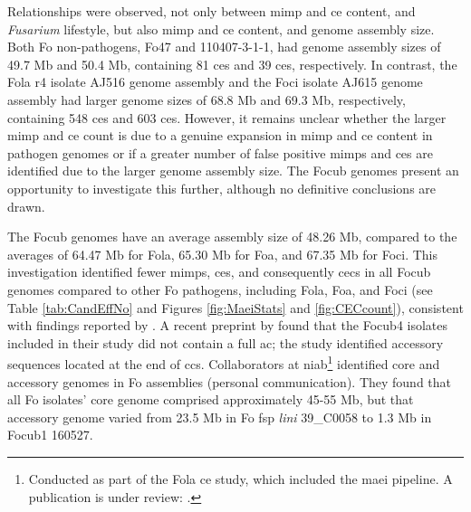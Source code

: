 Relationships were observed, not only between \ac{mimp} and \ac{ce} content, and \textit{Fusarium} lifestyle,  but also \ac{mimp} and \ac{ce} content, and genome assembly size. Both \ac{Fo} non-pathogens, Fo47 and 110407-3-1-1, had genome assembly sizes of 49.7 Mb and 50.4 Mb, containing 81 \acp{ce} and 39 \acp{ce}, respectively. In contrast, the \ac{Fola} \ac{r4} isolate AJ516 genome assembly and the \ac{Foci} isolate AJ615 genome assembly had larger genome sizes of 68.8 Mb and 69.3 Mb, respectively, containing 548 \acp{ce} and 603 \acp{ce}. However, it remains unclear whether the larger \ac{mimp} and \ac{ce} count is due to a genuine expansion in \ac{mimp} and \ac{ce} content in pathogen genomes or if a greater number of false positive \acp{mimp} and \acp{ce} are identified due to the larger genome assembly size. The \ac{Focub} genomes present an opportunity to investigate this further, although no definitive conclusions are drawn.

The \ac{Focub} genomes have an average assembly size of 48.26 Mb, compared to the averages of 64.47 Mb for \ac{Fola}, 65.30 Mb for \ac{Foa}, and 67.35 Mb for \ac{Foci}. This investigation identified fewer \acp{mimp}, \acp{ce}, and consequently \acp{cec} in all \ac{Focub} genomes compared to other \ac{Fo} pathogens, including \ac{Fola}, \ac{Foa}, and \ac{Foci} (see Table \ref{tab:CandEffNo} and Figures \ref{fig:MaeiStats} and \ref{fig:CECcount}), consistent with findings reported by \textcite{Dam2016, FoEC2}. A recent preprint by \textcite{Ma2023} found that the \ac{Focub4} isolates included in their study did not contain a full \acf{ac}; the study identified accessory sequences located at the end of \acfp{cc}. Collaborators at \ac{niab}\footnote{Conducted as part of the \acl{Fola} \ac{ce} study, which included the \ac{maei} pipeline. A publication is under review: \textcite{FolaManuscript}.} identified core and accessory genomes in \ac{Fo} assemblies (personal communication). They found that all \ac{Fo} isolates' core genome comprised approximately 45-55 Mb, but that accessory genome varied from 23.5 Mb in \ac{Fo} \ac{fsp} \textit{lini} 39\_C0058 to 1.3 Mb in \ac{Focub1} 160527. 

